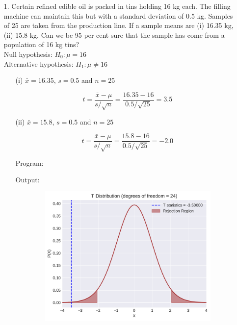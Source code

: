 \documentclass[a4paper,10pt,openright]{report}
\begin{document}
\begin{enumerate}

\item[1.] Certain refined edible oil is packed in tins holding 16 kg each. The filling
machine can maintain this but with a standard deviation of 0.5 kg. Samples of 25 are taken
from the production line. If a sample means are (i) 16.35 kg, (ii) 15.8 kg. Can we be 95 per
cent sure that the sample has come from a population of 16 kg tins? \\

Null hypothesis: $H_{0}: \mu = 16$ \\
Alternative hypothesis: $H_{1}: \mu \neq 16$ 

\begin{enumerate}
\item[(i)] $\bar x = 16.35$, $s = 0.5$ and $n = 25$ 

\begin{equation*}
t = \frac{\bar x - \mu}{s/\sqrt{n}}
  = \frac{16.35 - 16}{0.5/\sqrt{25}} 
  = 3.5
\end{equation*}

\item[(ii)] $\bar x = 15.8$, $s = 0.5$ and $n = 25$

\begin{equation*}
t = \frac{\bar x - \mu}{s/\sqrt{n}}
  = \frac{15.8 - 16}{0.5/\sqrt{25}}
  = -2.0
\end{equation*}	

\vspace{0.5cm}

Program:


Output:


\begin{figure}[ht!]
\includegraphics[width=14cm,height=7cm,keepaspectratio]{tscript1a.pdf}
\centering
\end{figure}


\end{enumerate}
\end{enumerate}
\end{document}

